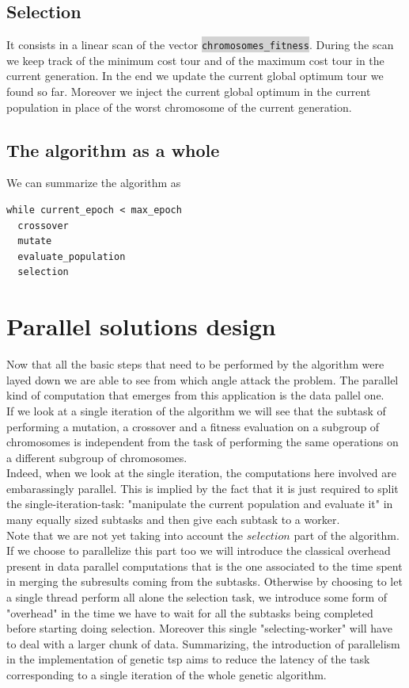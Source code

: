 \documentclass[11pt]{article}
\newcommand{\inlinecode}[2]{\colorbox{lightgray}{\lstinline[language=#1]$#2$}}
\begin{document}
\subsection{Selection}
It consists in a linear scan of the vector \inlinecode{C++}{chromosomes_fitness}. During the scan we keep track of the minimum cost tour and of the maximum cost tour in the current generation. In the end we update the current global optimum tour we found so far. Moreover we inject the current global optimum in the current population in place of the worst chromosome of the current generation.

\subsection{The algorithm as a whole}
We can summarize the algorithm as
\begin{lstlisting}
while current_epoch < max_epoch
  crossover
  mutate
  evaluate_population
  selection
\end{lstlisting}

\section{Parallel solutions design}
Now that all the basic steps that need to be performed by the algorithm were layed down we are able to see from which angle attack the problem. The parallel kind of computation that emerges from this application is the data pallel one.\\
If we look at a single iteration of the algorithm we will see that the subtask of performing a mutation, a crossover and a fitness evaluation on a subgroup of chromosomes is independent from the task of performing the same operations on a different subgroup of chromosomes.\\
Indeed, when we look at the single iteration, the computations here involved are embarassingly parallel. This is implied by the fact that it is just required to split the single-iteration-task: "manipulate the current population and evaluate it" in many equally sized subtasks and then give each subtask to a worker.\\
Note that we are not yet taking into account the $ selection $ part of the algorithm.
If we choose to parallelize this part too we will introduce the classical overhead present in data parallel computations that is the one associated to the time spent in merging the subresults coming from the subtasks. Otherwise by choosing to let a single thread perform all alone the selection task, we introduce some form of "overhead" in the time we have to wait for all the subtasks being completed before starting doing selection. Moreover this single "selecting-worker" will have to deal with a larger chunk of data.
Summarizing, the introduction of parallelism in the implementation of genetic tsp aims to reduce the latency of the task corresponding to a single iteration of the whole genetic algorithm.
\end{document}
